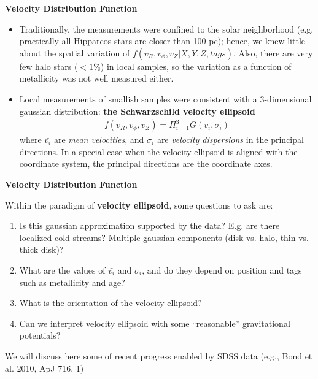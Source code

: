 \documentclass[letterpaper,landscape]{slides}
\begin{document}
\begin{slide}

\begin{center}
\bfseries
\large {} Velocity Distribution Function
\end{center}
\vskip 0.2in
\begin{itemize}
\item Traditionally, the measurements were confined to the solar
neighborhood (e.g. practically all Hipparcos stars are closer than
100 pc); hence, we knew little about the spatial variation of 
$f(v_R, v_\phi, v_Z | X,Y,Z,tags)$. Also, there are very few halo
stars ($<1\%$) in local samples, so the variation as a function of 
metallicity was not well measured either. 
\item Local measurements of smallish samples were consistent with
a 3-dimensional gaussian distribution: {\bf the Schwarzschild
velocity ellipsoid} 
\begin{eqnarray}
 f(v_R, v_\phi, v_Z) = \Pi_{i=1}^3 G(\bar{v_i},\sigma_i) \nonumber
\end{eqnarray}
where $\bar{v_i}$ are {\it mean velocities}, and $\sigma_i$ are
{\it velocity dispersions} in the principal directions. In a special 
case when the velocity ellipsoid is aligned with the coordinate system, 
the principal directions are the coordinate axes.

\end{itemize}    

\vfill
\end{slide}




\begin{slide}

\begin{center}
\bfseries
\large {} Velocity Distribution Function
\end{center}
\vskip 0.2in
{\color{blue} Within the paradigm of {\bf velocity ellipsoid}, 
some questions to ask are:}
\begin{enumerate}
\item Is this gaussian approximation supported by the data? 
      E.g. are there localized cold streams? Multiple gaussian 
      components (disk vs. halo, thin vs. thick disk)? 
\item What are the values of $\bar{v_i}$ and $\sigma_i$, and
   do they depend on position and tags such as metallicity and age? 
\item What is the orientation of the velocity ellipsoid?  
\item Can we interpret velocity ellipsoid with some ``reasonable''
      gravitational potentials?
\end{enumerate}    
{\color{blue} We will discuss here some of recent progress enabled by SDSS data (e.g., Bond et al. 2010, ApJ 716, 1)}

\vfill
\end{slide}
\end{document}
